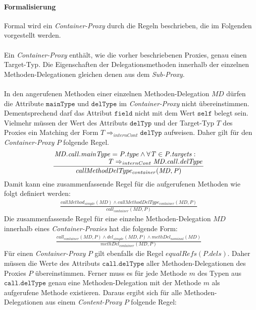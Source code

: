 \paragraph{Formalisierung}
Formal wird ein \emph{Container-Proxy} durch die Regeln beschrieben, die im Folgenden vorgestellt werden.
\\\\
Ein \emph{Container-Proxy} enthält, wie die vorher beschriebenen Proxies, genau einen Target-Typ. Die Eigenschaften der Delegationsmethoden innerhalb der einzelnen Methoden-Delegationen gleichen denen aus dem \emph{Sub-Proxy}.
\\\\
In den angerufenen Methoden einer einzelnen Methoden-Delegation $\mathit{MD}$ dürfen die Attribute $\texttt{mainType}$ und $\texttt{delType}$ im \emph{Container-Proxy} nicht übereinstimmen. Dementsprechend darf das Attribut $\texttt{field}$ nicht mit dem Wert $\texttt{self}$ belegt sein. Vielmehr müssen der Wert des Attributs $\texttt{delTyp}$ und der Target-Typ $T$ des Proxies ein Matching der Form $T \Rightarrow_{internCont} \texttt{delTyp}$ aufweisen. Daher gilt für den \emph{Container-Proxy} $P$ folgende Regel.
\begin{gather*}
\frac{\splitfrac{\mathit{MD.call.mainType} = \mathit{P.type} \wedge \forall \mathit{T} \in \mathit{P.targets}:}
{  \mathit{T} \Rightarrow_{internCont} \mathit{MD.call.delType}}
}
{\mathit{callMethodDelType_{container}(MD,P)}}
\end{gather*}
\noindent
Damit kann eine zusammenfassende Regel für die aufgerufenen Methoden wie folgt definiert werden:
\begin{gather*}
\frac{\mathit{callMethod_{simple}(MD)} \wedge \mathit{callMethodDelType_{container}(MD,P)}}
{\mathit{call_{container}(MD,P)}}
\end{gather*}
Die zusammenfassende Regel für eine einzelne Methoden-Delegation $\mathit{MD}$ innerhalb eines \emph{Container-Proxies} hat die folgende Form:
\begin{gather*}
\frac{\mathit{call_{container}(MD,P)} \wedge \mathit{del_{simple}(MD,P)} \wedge \mathit{methDel_{nominal}(MD)}}
{\mathit{methDel_{container}(MD,P)}}
\end{gather*}
Für einen \emph{Container-Proxy} $P$ gilt ebenfalls die Regel $\mathit{equalRefs(P.dels)}$. Daher müssen die Werte des Attributs $\texttt{call.delType}$ aller Methoden-Delegationen des Proxies $P$ übereinstimmen. Ferner muss es für jede Methode $m$ des Typen aus $\texttt{call.delType}$ genau eine Methoden-Delegation mit der Methode $m$ als aufgerufene Methode existieren. Daraus ergibt sich für alle Methoden-Delegationen aus einem \emph{Content-Proxy} $P$ folgende Regel:
